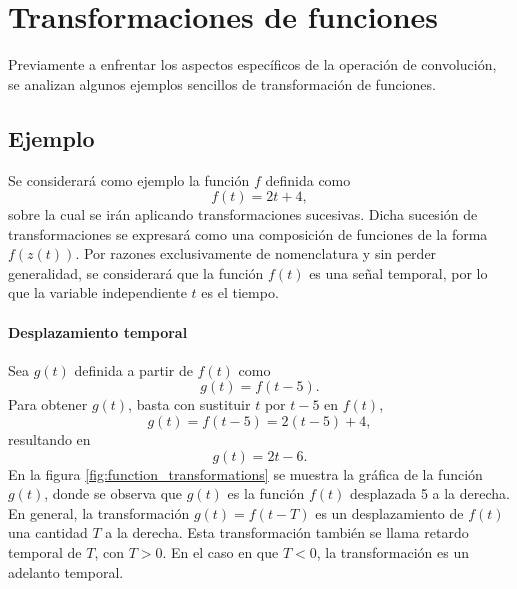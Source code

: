 \documentclass[a4paper]{article}
\begin{document}
\section{Transformaciones de funciones}

Previamente a enfrentar los aspectos específicos de la operación de convolución, se analizan algunos ejemplos sencillos de transformación de funciones. 

\subsection{Ejemplo}

Se considerará como ejemplo la función \(f\) definida como
\begin{equation}\label{eq:f}
 f(t)=2t+4,
\end{equation}
sobre la cual se irán aplicando transformaciones sucesivas. Dicha sucesión de transformaciones se expresará como una composición de funciones de la forma \(f(z(t))\). Por razones exclusivamente de nomenclatura y sin perder generalidad, se considerará que la función \(f(t)\) es una señal temporal, por lo que la variable independiente \(t\) es el tiempo.

\paragraph{Desplazamiento temporal} Sea \(g(t)\) definida a partir de \(f(t)\) como
\[
 g(t)=f(t-5).
\]
Para obtener \(g(t)\), basta con sustituir \(t\) por \(t-5\) en \(f(t)\),
\[
 g(t)=f(t-5)=2(t-5)+4,
\]
resultando en
\begin{equation}\label{eq:g}
 g(t)=2t-6.
\end{equation}
En la figura \ref{fig:function_transformations} se muestra la gráfica de la función \(g(t)\), donde se observa que \(g(t)\) es la función \(f(t)\) desplazada 5 a la derecha. En general, la transformación \(g(t)=f(t-T)\) es un desplazamiento de \(f(t)\) una cantidad \(T\) a la derecha. Esta transformación también se llama retardo temporal de \(T\), con \(T>0\). En el caso en que \(T<0\), la transformación es un adelanto temporal.
\end{document}
